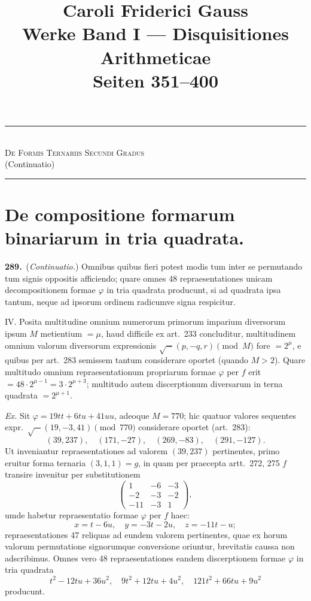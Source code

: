 \documentclass[12pt,a4paper]{article}
\title{\vspace{-1cm}\textbf{Caroli Friderici Gauss}\\[0.5em]
\LARGE Werke Band I --- Disquisitiones Arithmeticae\\[0.3em]
\Large Seiten 351--400}
\author{}
\date{}
\theoremstyle{plain}
\theoremstyle{definition}
\theoremstyle{remark}
\begin{document}
\maketitle
\thispagestyle{empty}

\begin{center}
\rule{0.8\textwidth}{0.4pt}\\[0.5em]
{\large \textsc{De Formis Ternariis Secundi Gradus}\\[0.3em]
(Continuatio)}\\[0.5em]
\rule{0.8\textwidth}{0.4pt}
\end{center}

\vspace{1em}

\section*{De compositione formarum binariarum in tria quadrata.}

\textbf{289.}~(\textit{Continuatio.}) Omnibus quibus fieri potest modis tum inter se permutando tum signis oppositis afficiendo; quare omnes 48 repraesentationes unicam decompositionem formae $\varphi$ in tria quadrata producunt, si ad quadrata ipsa tantum, neque ad ipsorum ordinem radicumve signa respicitur.

\textsc{IV.} Posita multitudine omnium numerorum primorum imparium diversorum ipsum $M$ metientium $= \mu$, haud difficile ex art.~233 concluditur, multitudinem omnium valorum diversorum expressionis $\surd{-}(p,-q,r)\pmod{M}$ fore $= 2^\mu$, e quibus per art.~283 semissem tantum considerare oportet (quando $M>2$). Quare multitudo omnium repraesentationum propriarum formae $\varphi$ per $f$ erit $= 48 \cdot 2^{\mu-1} = 3 \cdot 2^{\mu+3}$; multitudo autem discerptionum diversarum in terna quadrata $= 2^{\mu+1}$.

\textit{Ex.} Sit $\varphi = 19tt + 6tu + 41uu$, adeoque $M = 770$; hic quatuor valores sequentes expr.~$\surd{-}(19,-3,41)\pmod{770}$ considerare oportet (art.~283):
\[
(39,237),\quad (171,-27),\quad (269,-83),\quad (291,-127).
\]
Ut inveniantur repraesentationes ad valorem $(39,237)$ pertinentes, primo eruitur forma ternaria $(3,1,1)=g$, in quam per praecepta artt.~272, 275 $f$ transire invenitur per substitutionem
\[
\begin{pmatrix} 1 & -6 & -3 \\ -2 & -3 & -2 \\ -11 & -3 & 1 \end{pmatrix},
\]
umde habetur repraesentatio formae $\varphi$ per $f$ haec:
\[
x = t - 6u,\quad y = -3t - 2u,\quad z = -11t - u;
\]
repraesentationes 47 reliquas ad eundem valorem pertinentes, quae ex horum valorum permutatione signorumque conversione oriuntur, brevitatis caussa non adscribimus. Omnes vero 48 repraesentationes eandem discerptionem formae $\varphi$ in tria quadrata
\[
t^2 - 12tu + 36u^2,\quad 9t^2 + 12tu + 4u^2,\quad 121t^2 + 66tu + 9u^2
\]
producunt.
\end{document}
